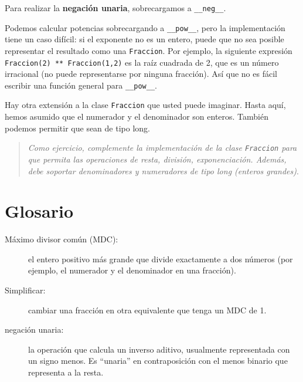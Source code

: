 Para realizar la  {\bf negación unaria}, sobrecargamos a  \texttt{\_\_neg\_\_}.


Podemos calcular potencias sobrecargando a \texttt{\_\_pow\_\_},
pero la implementación tiene un caso difícil: si el exponente no 
es un entero, puede que no sea posible representar el resultado
como una  \texttt{Fraccion}.  Por ejemplo, la siguiente expresión \texttt{Fraccion(2) ** Fraccion(1,2)}
es la raíz cuadrada de 2, que es un número irracional (no puede
representarse por ninguna fracción). Así que no es fácil escribir 
una función general para  \texttt{\_\_pow\_\_}.



Hay otra extensión a la clase  \texttt{Fraccion} que usted puede
imaginar. Hasta aquí, hemos asumido que el numerador y el 
denominador son enteros. También podemos permitir que sean 
de tipo long.

\begin{quote}
{\em  Como ejercicio, complemente la implementación de la clase
 \texttt{Fraccion} para que permita las operaciones de resta,
división, exponenciación. Además, debe soportar denominadores y 
numeradores de tipo long (enteros grandes)}.
\end{quote}



\section{Glosario}

\begin{description}

\item[Máximo divisor común (MDC):] el entero positivo más grande
que divide exactamente a dos números (por ejemplo, el numerador y 
el denominador en una fracción).

\item[Simplificar:] cambiar una fracción en otra equivalente que
tenga un MDC de 1.

\item[negación unaria:] la operación que calcula un inverso 
aditivo, usualmente representada con un signo menos. Es  
``unaria'' en contraposición con el menos binario que 
representa a la resta.



\end{description}
